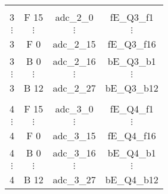 \begin{tabular}{cccc}
          &                            		   				    &               &               \\
3         &  F 15             				   				    &  adc\_2\_0    &  fE\_Q3\_f1   \\
$\vdots$  &  $\vdots$                  		   				    &  $\vdots$     &  $\vdots$     \\
3         &  F 0              				   				    &  adc\_2\_15   &  fE\_Q3\_f16  \\
3         &  B 0              				   				    &  adc\_2\_16   &  bE\_Q3\_b1   \\
$\vdots$  &  $\vdots$                  		   				    &  $\vdots$     &  $\vdots$     \\
3         &  B 12             				   				    &  adc\_2\_27   &  bE\_Q3\_b12  \\
          &                            		   				    &               &               \\
4         &  F 15             				   				    &  adc\_3\_0    &  fE\_Q4\_f1   \\
$\vdots$  &  $\vdots$                  		   				    &  $\vdots$     &  $\vdots$     \\
4         &  F 0              				   				    &  adc\_3\_15   &  fE\_Q4\_f16  \\
4         &  B 0              				   				    &  adc\_3\_16   &  bE\_Q4\_b1   \\
$\vdots$  &  $\vdots$                  		   				    &  $\vdots$     &  $\vdots$     \\
4         &  B 12             	 			   				    &  adc\_3\_27   &  bE\_Q4\_b12  \\
\hline
\end{tabular}